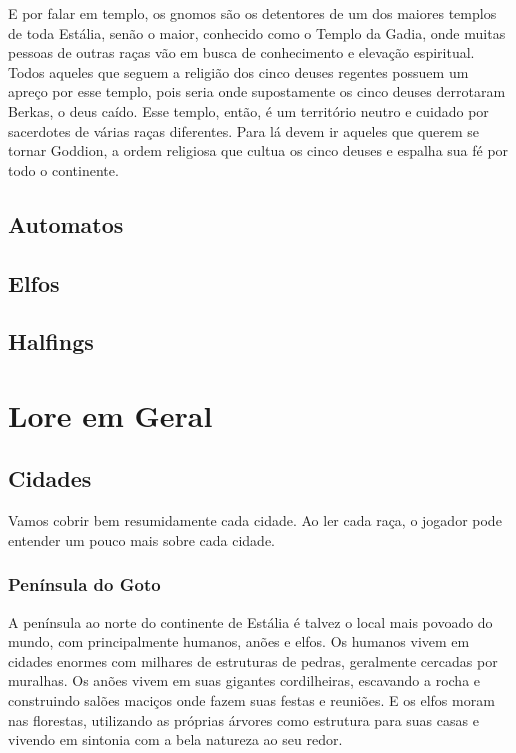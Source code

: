 \documentclass{RPG_Adventure}[2021/10/20]
\begin{document}
E por falar em templo, os gnomos são os detentores de um dos maiores templos de
toda Estália, senão o maior, conhecido como o Templo da Gadia, onde muitas
pessoas de outras raças vão em busca de conhecimento e elevação espiritual.
Todos aqueles que seguem a religião dos cinco deuses regentes possuem um apreço
por esse templo, pois seria onde supostamente os cinco deuses derrotaram Berkas,
o deus caído. Esse templo, então, é um território neutro e cuidado por
sacerdotes de várias raças diferentes. Para lá devem ir aqueles que querem se
tornar Goddion, a ordem religiosa que cultua os cinco deuses e espalha sua fé
por todo o continente.

\section*{Automatos}%


\section*{Elfos}%

\section*{Halfings}%


\chapter{Lore em Geral}%
\label{cha:lore_em_geral}

\section{Cidades}%

Vamos cobrir bem resumidamente cada cidade. Ao ler cada raça, o jogador pode
entender um pouco mais sobre cada cidade.

\subsection{Península do Goto}%
\label{sub:peninsula_do_goto}

A península ao norte do continente de Estália é talvez o local mais povoado do
mundo, com principalmente humanos, anões e elfos. Os humanos vivem em cidades
enormes com milhares de estruturas de pedras, geralmente cercadas por muralhas.
Os anões vivem em suas gigantes cordilheiras, escavando a rocha e construindo
salões maciços onde fazem suas festas e reuniões. E os elfos moram nas
florestas, utilizando as próprias árvores como estrutura para suas casas e
vivendo em sintonia com a bela natureza ao seu redor.
\end{document}
